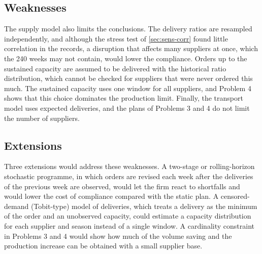 \documentclass[11pt,a4paper]{article}
\begin{document}
\subsection{Weaknesses}
The supply model also limits the conclusions.
The delivery ratios are resampled independently, and although the stress test of \cref{sec:sens-corr} found little correlation in the records, a disruption that affects many suppliers at once, which the 240 weeks may not contain, would lower the compliance.
Orders up to the sustained capacity are assumed to be delivered with the historical ratio distribution, which cannot be checked for suppliers that were never ordered this much.
The sustained capacity uses one window for all suppliers, and Problem 4 shows that this choice dominates the production limit.
Finally, the transport model uses expected deliveries, and the plans of Problems 3 and 4 do not limit the number of suppliers.

\subsection{Extensions}
Three extensions would address these weaknesses.
A two-stage or rolling-horizon stochastic programme, in which orders are revised each week after the deliveries of the previous week are observed, would let the firm react to shortfalls and would lower the cost of compliance compared with the static plan.
A censored-demand (Tobit-type) model of deliveries, which treats a delivery as the minimum of the order and an unobserved capacity, could estimate a capacity distribution for each supplier and season instead of a single window.
A cardinality constraint in Problems 3 and 4 would show how much of the volume saving and the production increase can be obtained with a small supplier base.

\end{document}
